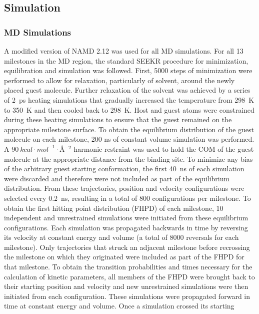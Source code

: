 \subsection*{Simulation}
\subsubsection*{MD Simulations}
\par A modified version of NAMD 2.12 was used for all MD simulations\cite{Phillips2005}.
For all 13 milestones in the MD region, the standard SEEKR procedure for
minimization, equilibration and simulation was followed. First, 5000 steps of
minimization were performed to allow for relaxation, particularly of solvent,
around the newly placed guest molecule. Further relaxation of the solvent was
achieved by a series of 2~ps heating simulations that gradually increased the
temperature from 298~K to 350~K and then cooled back to 298~K. Host and guest atoms
were constrained during these heating simulations to ensure that the guest
remained on the appropriate milestone surface. To obtain the equilibrium
distribution of the guest molecule on each milestone, 200 ns of constant
volume simulation was performed. A $\SI{90}{kcal\cdot mol^{-1}\cdot\angstrom^{-2}}$
harmonic restraint was used to hold the COM of the guest molecule at the appropriate
distance from the binding site. To minimize any bias of the arbitrary guest
starting conformation, the first 40~ns of each simulation were discarded and
therefore were not included as part of the equilibrium distribution. From these
trajectories, position and velocity configurations were selected every 0.2~ns,
resulting in a total of 800 configurations per milestone. To obtain the first
hitting point distribution (FHPD) of each milestone, 10 independent and
unrestrained simulations were initiated from these equilibrium configurations.
Each simulation was propagated backwards in time by reversing its velocity at
constant energy and volume (a total of 8000 reversals for each milestone).
Only trajectories that struck an adjacent milestone before recrossing the
milestone on which they originated were included as part of the FHPD for that
milestone. To obtain the transition probabilities and times necessary for the
calculation of kinetic parameters, all members of the FHPD were brought back to
their starting position and velocity and new unrestrained simulations were then
initiated from each configuration. These simulations were propagated forward in
time at constant energy and volume. Once a simulation crossed its starting
